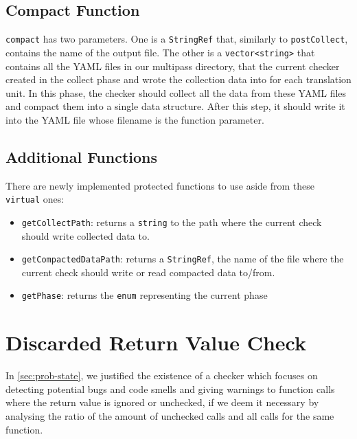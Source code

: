 \subsection{Compact Function}

\texttt{compact} has two parameters. One is a \texttt{StringRef} that, similarly to \texttt{postCollect}, contains the
name of the output file.
The other is a \texttt{vector<string>} that contains all the YAML files in our multipass directory, that the
current checker created in the collect phase and wrote the collection data into for each translation unit.
In this phase, the checker should collect all the data from these YAML files and compact them into a single data structure. After
this step, it should write it into the YAML file whose filename is the function parameter.

\subsection{Additional Functions}

There are newly implemented protected functions to use aside from these \texttt{virtual} ones:
\begin{itemize}
  \item \texttt{getCollectPath}: returns a \texttt{string} to the path where the current check should write collected data to.
  \item \texttt{getCompactedDataPath}: returns a \texttt{StringRef}, the name of the file where the current check should write or read compacted data to/from.
  \item \texttt{getPhase}: returns the \texttt{enum} representing the current phase
\end{itemize}

\section{Discarded Return Value Check} %
\label{sec:dev-checker}

In \cref{sec:prob-state}, we justified the existence of a checker which focuses on detecting potential bugs and code smells
and giving warnings to function calls where the return value is ignored or unchecked, if we deem it necessary by analysing the ratio
of the amount of unchecked calls and all calls for the same function.

